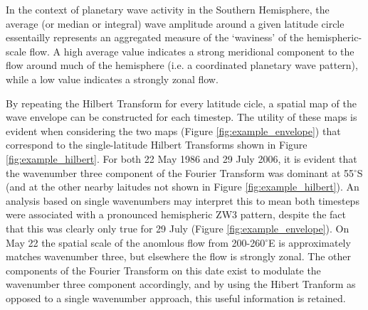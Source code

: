 In the context of planetary wave activity in the Southern Hemisphere, the average (or median or integral) wave amplitude around a given latitude circle essentailly represents an aggregated measure of the `waviness' of the hemispheric-scale flow. A high average value indicates a strong meridional component to the flow around much of the hemisphere (i.e. a coordinated planetary wave pattern), while a low value indicates a strongly zonal flow. 

By repeating the Hilbert Transform for every latitude cicle, a spatial map of the wave envelope can be constructed for each timestep. The utility of these maps is evident when considering the two maps (Figure \ref{fig:example_envelope}) that correspond to the single-latitude Hilbert Transforms shown in Figure \ref{fig:example_hilbert}. For both 22 May 1986 and 29 July 2006, it is evident that the wavenumber three component of the Fourier Transform was dominant at 55$^{\circ}$S (and at the other nearby laitudes not shown in Figure \ref{fig:example_hilbert}). An analysis based on single wavenumbers may interpret this to mean both timesteps were associated with a pronounced hemispheric ZW3 pattern, despite the fact that this was clearly only true for 29 July (Figure \ref{fig:example_envelope}). On May 22 the spatial scale of the anomlous flow from 200-260$^{\circ}$E is approximately matches wavenumber three, but elsewhere the flow is strongly zonal. The other components of the Fourier Transform on this date exist to modulate the wavenumber three component accordingly, and by using the Hibert Tranform as opposed to a single wavenumber approach, this useful information is retained.
